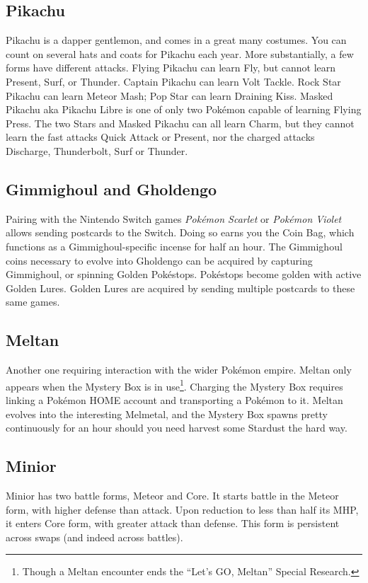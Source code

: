\subsection{Pikachu\label{subsec:pikachu}}
Pikachu is a dapper gentlemon, and comes in a great many costumes.
You can count on several hats and coats for Pikachu each year.
More substantially, a few forms have different attacks.
Flying Pikachu can learn Fly, but cannot learn Present, Surf, or Thunder.
Captain Pikachu can learn Volt Tackle.
Rock Star Pikachu can learn Meteor Mash; Pop Star can learn Draining Kiss.
Masked Pikachu aka Pikachu Libre is one of only two Pokémon capable of learning Flying Press.
The two Stars and Masked Pikachu can all learn Charm, but they cannot learn the fast attacks Quick Attack or Present,
 nor the charged attacks Discharge, Thunderbolt, Surf or Thunder.

\subsection{Gimmighoul and Gholdengo\label{subsec:gimmighoul}}
Pairing with the Nintendo Switch games \textit{Pokémon Scarlet} or \textit{Pokémon Violet}
 allows sending postcards to the Switch.
Doing so earns you the Coin Bag, which functions as a Gimmighoul-specific incense for half an hour.
The Gimmighoul coins necessary to evolve into Gholdengo can be acquired by capturing
 Gimmighoul, or spinning Golden Pokéstops.
Pokéstops become golden with active Golden Lures.
Golden Lures are acquired by sending multiple postcards to these same games.

\subsection{Meltan\label{subsec:meltan}}
Another one requiring interaction with the wider Pokémon empire.
Meltan only appears when the Mystery Box is in use\footnote{Though a Meltan encounter ends the ``Let's GO, Meltan'' Special Research.}.
Charging the Mystery Box requires linking a Pokémon HOME account and transporting
  a Pokémon to it.
Meltan evolves into the interesting Melmetal, and the Mystery
  Box spawns pretty continuously for an hour should you need harvest some Stardust
  the hard way.

\subsection{Minior\label{subsec:minior}}
Minior has two battle forms, Meteor and Core. It starts battle in the Meteor form, with
higher defense than attack. Upon reduction to less than half its MHP, it enters
Core form, with greater attack than defense. This form is persistent across swaps
(and indeed across battles).

